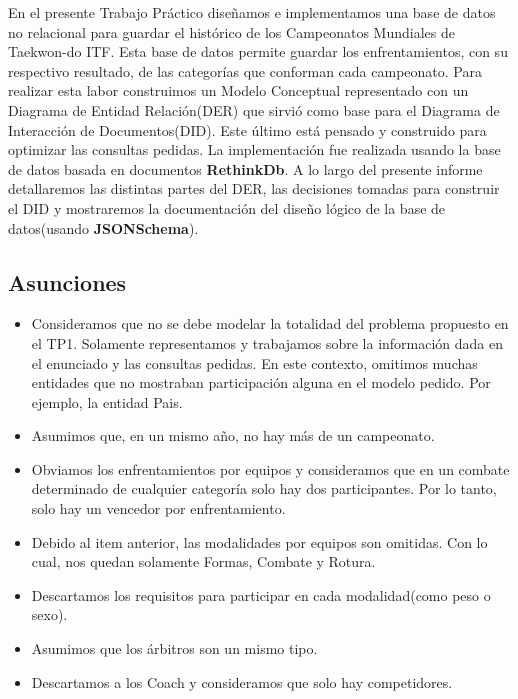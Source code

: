 En el presente Trabajo Práctico diseñamos e implementamos una base de datos no relacional para guardar el histórico de los
Campeonatos Mundiales de Taekwon-do ITF. Esta base de datos permite guardar los enfrentamientos, con su respectivo
resultado, de las categorías que conforman cada campeonato. Para realizar esta labor construimos un Modelo Conceptual representado con un
Diagrama de Entidad Relación(DER) que sirvió como base para el Diagrama de Interacción de Documentos(DID). Este último está
pensado y construido para optimizar las consultas pedidas. La implementación fue realizada usando la base de datos basada
en documentos \textbf{RethinkDb}. A lo largo del presente informe detallaremos las distintas partes del DER, las decisiones
tomadas para construir el DID y mostraremos la documentación del diseño lógico de la base de datos(usando \textbf{JSONSchema}).

\subsection{Asunciones}
\begin{itemize}
\item Consideramos que no se debe modelar la totalidad del problema propuesto en el TP1. Solamente representamos y trabajamos
sobre la información dada en el enunciado y las consultas pedidas. En este contexto, omitimos muchas entidades que no mostraban
participación alguna en el modelo pedido. Por ejemplo, la entidad Pais.
\item Asumimos que, en un mismo año, no hay más de un campeonato.
\item Obviamos los enfrentamientos por equipos y consideramos que en un combate determinado de cualquier categoría solo hay
dos participantes. Por lo tanto, solo hay un vencedor por enfrentamiento.
\item Debido al item anterior, las modalidades por equipos son omitidas. Con lo cual, nos quedan solamente Formas, Combate y
Rotura.
\item Descartamos los requisitos para participar en cada modalidad(como peso o sexo).
\item Asumimos que los árbitros son un mismo tipo.
\item Descartamos a los Coach y consideramos que solo hay competidores.
\end{itemize}
